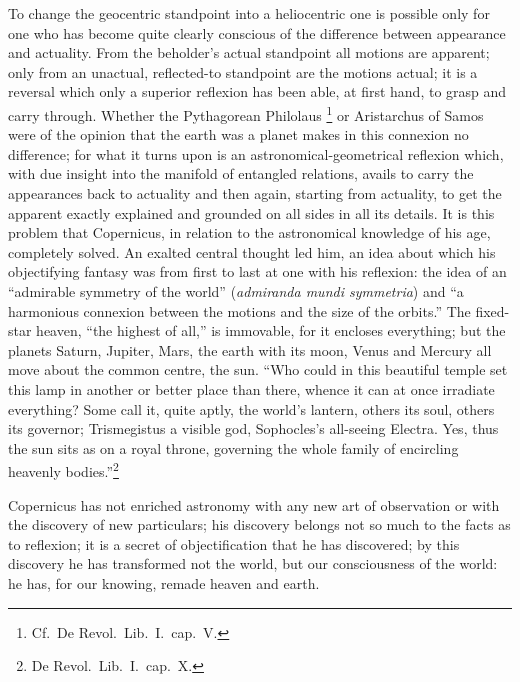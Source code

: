 \documentclass[12pt,a4paper]{book}
\renewcommand{\thefootnote}{*)}
\begin{document}
To change the geocentric standpoint into a heliocentric one is possible only for one who has become
quite clearly conscious of the difference between appearance and actuality. From the beholder's actual
standpoint all motions are apparent; only from an unactual, reflected-to standpoint are the motions
actual; it is a reversal which only a superior reflexion has been able, at first hand, to grasp and
carry through. Whether the Pythagorean Philolaus%
\renewcommand{\thefootnote}{**)}%
\footnote{%
Cf.\ De Revol.\ Lib.\ I.\ cap.\ V.}%
\renewcommand{\thefootnote}{*)}
or Aristarchus of Samos were of the opinion that the earth was a planet makes in this connexion no
difference; for what it turns upon is an astronomical-geometrical reflexion which, with due insight
into
the manifold of entangled relations, avails to carry the appearances back to actuality and then again,
starting from actuality, to get the apparent exactly explained and grounded on all sides in all its
details. It is this problem that Copernicus, in relation to the astronomical knowledge of his age,
completely solved. An exalted central thought led him, an idea about which his objectifying fantasy was
from first to last at one with his reflexion: the idea of an ``admirable symmetry of the world''
(\textit{admiranda mundi symmetria}) and ``a harmonious connexion between the motions and the size of
the orbits.'' The fixed-star heaven, ``the highest of all,'' is immovable, for it encloses everything;
but the planets Saturn, Jupiter, Mars, the earth with its moon, Venus and Mercury all move about the
common centre, the sun. ``Who could in this beautiful temple set this lamp in another or better place
than there, whence it can at once irradiate everything? Some call it, quite aptly, the world's lantern,
others its soul, others its governor; Trismegistus a visible god, Sophocles's all-seeing Electra. Yes,
thus the sun sits as on a royal throne, governing the whole family of encircling heavenly
bodies.''\footnote{%
De Revol.\ Lib.\ I.\ cap.\ X.}

Copernicus has not enriched astronomy with any new art of observation or with the discovery of new
particulars; his discovery belongs not so much to the facts as to reflexion; it is a secret of
objectification that he has discovered; by this discovery he has transformed not the world, but our
consciousness of the world: he has, for our knowing, remade heaven and earth.
\end{document}
